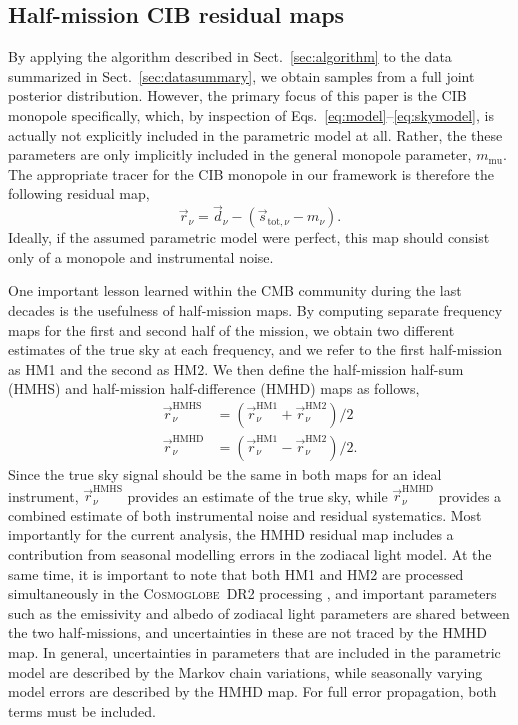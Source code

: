 \documentclass{aa}
\newcommand{\dv}[0]{\vec{d}}
\newcommand{\s}[0]{\vec{s}}
\renewcommand{\r}[0]{\vec{r}}
\newcommand{\cosmoglobe}{\textsc{Cosmoglobe}}
\begin{document}
\subsection{Half-mission CIB residual maps}

By applying the algorithm described in Sect.~\ref{sec:algorithm} to
the data summarized in Sect.~\ref{sec:datasummary}, we obtain samples
from a full joint posterior distribution. However, the primary focus
of this paper is the CIB monopole specifically, which, by inspection
of Eqs.~\eqref{eq:model}--\eqref{eq:skymodel}, is actually not
explicitly included in the parametric model at all. Rather, the these
parameters are only implicitly included in the general monopole
parameter, $m_{\mathrm{mu}}$. The appropriate tracer for the CIB
monopole in our framework is therefore the following residual map,
\begin{equation}
\r_{\nu} = \dv_{\nu} - \left(\s_{\mathrm{tot},\nu} - m_{\nu}\right).
\end{equation}
Ideally, if the assumed parametric model were perfect, this map should
consist only of a monopole and instrumental noise.

One important lesson learned within the CMB community during the last
decades is the usefulness of half-mission maps. By computing separate
frequency maps for the first and second half of the mission, we obtain
two different estimates of the true sky at each frequency, and we
refer to the first half-mission as HM1 and the second as HM2. We then
define the half-mission half-sum (HMHS) and half-mission
half-difference (HMHD) maps as follows,
\begin{align}
\r_{\nu}^{\mathrm{HMHS}} &= (\r_{\nu}^{\mathrm{HM1}} + \r_{\nu}^{\mathrm{HM2}})/2\\
\r_{\nu}^{\mathrm{HMHD}} &= (\r_{\nu}^{\mathrm{HM1}} -
\r_{\nu}^{\mathrm{HM2}})/2.
\end{align}
Since the true sky signal should be the same in both maps for an ideal
instrument, $\r_{\nu}^{\mathrm{HMHS}}$ provides an estimate of the
true sky, while $\r_{\nu}^{\mathrm{HMHD}}$ provides a combined
estimate of both instrumental noise and residual systematics. Most
importantly for the current analysis, the HMHD residual map includes a
contribution from seasonal modelling errors in the zodiacal light
model. At the same time, it is important to note that both HM1 and HM2
are processed simultaneously in the \cosmoglobe\ DR2 processing
\citep{CG02_01}, and important parameters such as the emissivity and
albedo of zodiacal light parameters are shared between the two
half-missions, and uncertainties in these are not traced by the HMHD
map. In general, uncertainties in parameters that are included in the
parametric model are described by the Markov chain variations, while
seasonally varying model errors are described by the HMHD map. For
full error propagation, both terms must be included.
\end{document}
